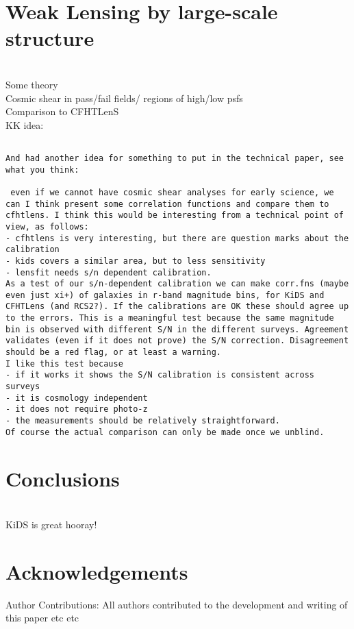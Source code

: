 \documentclass[useAMS,usenatbib,times,letter,amssymb]{mn2e}
\newcommand{\red}[1]{{\color{red}{#1}}}
\begin{document}
\section{Weak Lensing by large-scale structure}
\red{KK/CH} \\
Some theory\\
Cosmic shear in pass/fail fields/ regions of high/low psfs\\
Comparison to CFHTLenS\\
KK idea:
\begin{verbatim}

And had another idea for something to put in the technical paper, see what you think:

 even if we cannot have cosmic shear analyses for early science, we can I think present some correlation functions and compare them to cfhtlens. I think this would be interesting from a technical point of view, as follows:
- cfhtlens is very interesting, but there are question marks about the calibration
- kids covers a similar area, but to less sensitivity
- lensfit needs s/n dependent calibration.
As a test of our s/n-dependent calibration we can make corr.fns (maybe even just xi+) of galaxies in r-band magnitude bins, for KiDS and CFHTLens (and RCS2?). If the calibrations are OK these should agree up to the errors. This is a meaningful test because the same magnitude bin is observed with different S/N in the different surveys. Agreement validates (even if it does not prove) the S/N correction. Disagreement should be a red flag, or at least a warning.
I like this test because 
- if it works it shows the S/N calibration is consistent across surveys
- it is cosmology independent 
- it does not require photo-z
- the measurements should be relatively straightforward.
Of course the actual comparison can only be made once we unblind.
\end{verbatim}


\section{Conclusions}
\red{KK}\\
KiDS is great hooray!






\section{Acknowledgements}

{\small Author Contributions: All authors contributed to the development and writing of this paper etc etc}



\label{lastpage}
\end{document}
